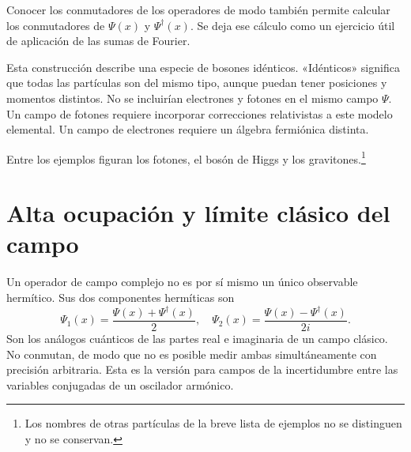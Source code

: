 Conocer los conmutadores de los operadores de modo también permite calcular los conmutadores de \(\Psi(x)\) y \(\Psi^\dagger(x)\). Se deja ese cálculo como un ejercicio útil de aplicación de las sumas de Fourier.

Esta construcción describe una especie de bosones idénticos. «Idénticos» significa que todas las partículas son del mismo tipo, aunque puedan tener posiciones y momentos distintos. No se incluirían electrones y fotones en el mismo campo \(\Psi\). Un campo de fotones requiere incorporar correcciones relativistas a este modelo elemental. Un campo de electrones requiere un álgebra fermiónica distinta.

\begin{classroomqa}
\end{classroomqa}


Entre los ejemplos figuran los fotones, el bosón de Higgs y los gravitones.\footnote{Los nombres de otras partículas de la breve lista de ejemplos no se distinguen y no se conservan.}

\section{Alta ocupación y límite clásico del campo}

Un operador de campo complejo no es por sí mismo un único observable hermítico. Sus dos componentes hermíticas son
\begin{equation}
\Psi_1(x)=\frac{\Psi(x)+\Psi^\dagger(x)}{2},
\quad
\Psi_2(x)=\frac{\Psi(x)-\Psi^\dagger(x)}{2i}.
\end{equation}
Son los análogos cuánticos de las partes real e imaginaria de un campo clásico. No conmutan, de modo que no es posible medir ambas simultáneamente con precisión arbitraria. Esta es la versión para campos de la incertidumbre entre las variables conjugadas de un oscilador armónico.

